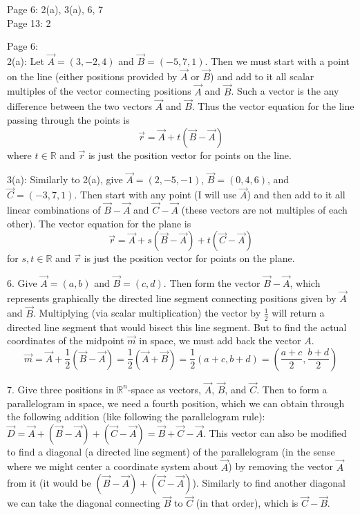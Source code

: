\documentclass[11pt]{article}
\newcommand{\br}[1]{\left(#1\right)}
\begin{document}
Page 6: 2(a), 3(a), 6, 7 \\
Page 13: 2

Page 6: \\

2(a): Let $\vec{A} = (3,-2,4)$ and $\vec{B} = (-5,7,1)$. Then we must start with a point on the line (either positions provided by $\vec{A}$ or $\vec{B}$) and add to it all scalar multiples of the vector connecting positions $\vec{A}$ and $\vec{B}$. Such a vector is the any difference between the two vectors $\vec{A}$ and $\vec{B}$. Thus the vector equation for the line passing through the points is $$\boxed{\vec{r} = \vec{A} + t\br{\vec{B}-\vec{A}}}$$ where $t\in\mathbb{R}$ and $\vec{r}$ is just the position vector for points on the line.

3(a): Similarly to 2(a), give $\vec{A} = (2,-5,-1)$, $\vec{B} = (0,4,6)$, and $\vec{C} = (-3,7,1)$. Then start with any point (I will use $\vec{A}$) and then add to it all linear combinations of $\vec{B} - \vec{A}$ and $\vec{C} - \vec{A}$ (these vectors are not multiples of each other). The vector equation for the plane is $$\boxed{\vec{r} = \vec{A} + s\br{\vec{B} - \vec{A}} + t\br{\vec{C} - \vec{A}}}$$ for $s,t\in \mathbb{R}$ and $\vec{r}$ is just the position vector for points on the plane.

6. Give $\vec{A} = (a,b)$ and $\vec{B} = (c,d)$. Then form the vector $\vec{B} - \vec{A}$, which represents graphically the directed line segment connecting positions given by $\vec{A}$ and $\vec{B}$. Multiplying (via scalar multiplication) the vector by $\frac{1}{2}$ will return a directed line segment that would bisect this line segment. But to find the actual coordinates of the midpoint $\vec{m}$ in space, we must add back the vector $A$. $$\boxed{\vec{m} = \vec{A} + \frac{1}{2}\br{\vec{B} - \vec{A}} = \frac{1}{2}\br{\vec{A} + \vec{B}} = \frac{1}{2}\br{a+c, b+d} = \br{\frac{a+c}{2}, \frac{b+d}{2}}}$$

7. Give three positions in $\mathbb{R}^n$-space as vectors, $\vec{A}$, $\vec{B}$, and $\vec{C}$. Then to form a parallelogram in space, we need a fourth position, which we can obtain through the following addition (like following the parallelogram rule):
$\vec{D} = \vec{A} + \br{\vec{B} - \vec{A}} + \br{\vec{C} - \vec{A}} = \vec{B}+\vec{C}-\vec{A}$. This vector can also be modified to find a diagonal (a directed line segment) of the parallelogram (in the sense where we might center a coordinate system about $\vec{A}$) by removing the vector $\vec{A}$ from it (it would be $\br{\vec{B} - \vec{A}} + \br{\vec{C} - \vec{A}}$). Similarly to find another diagonal we can take the diagonal connecting $\vec{B}$ to $\vec{C}$ (in that order), which is $\vec{C}-\vec{B}$. 
\end{document}
